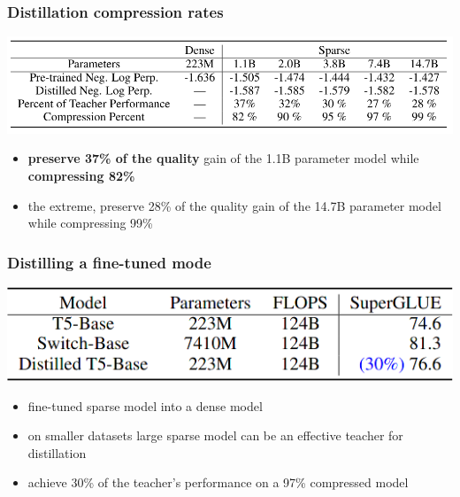 \documentclass{beamer}
\begin{document}
\begin{frame}
    \frametitle{Distillation compression rates}
    \begin{center}
        \includegraphics[scale=0.33]{img/switch_transformers_distilled_all.png}
        \begin{itemize}
            \item \textbf{preserve 37\% of the quality} gain of the 1.1B parameter model while \textbf{compressing 82\%}
            \item the extreme, preserve 28\% of the quality gain of the 14.7B parameter model while compressing 99\%
        \end{itemize}
    \end{center}
\end{frame}

\begin{frame}
    \frametitle{Distilling a fine-tuned mode}
    \begin{center}
        \includegraphics[scale=0.45]{img/switch_transformers_distilled_final.png}
        \begin{itemize}
        	\item fine-tuned sparse model into a dense model
            \item on smaller datasets large sparse model can be an effective teacher for distillation
            \item achieve 30\% of the teacher’s performance on a 97\% compressed model
        \end{itemize}
    \end{center}
\end{frame}
\end{document}
